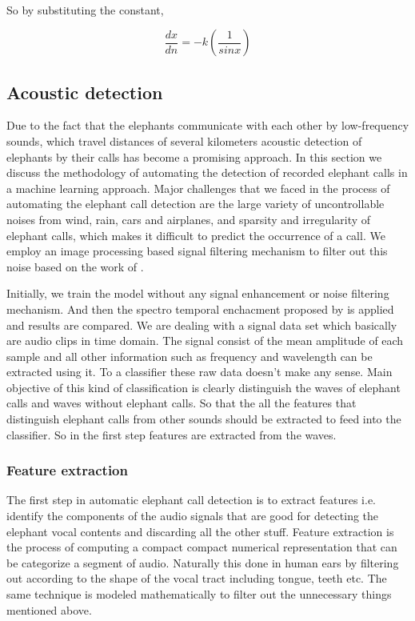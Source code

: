 \documentclass[12pt]{article}
\numberwithin{figure}{section}
\numberwithin{table}{section}
\begin{document}
\paragraph{}
So by substituting the constant,

\begin{equation}
\frac{dx}{dn}=-k(\frac{1}{sin x})
\end{equation}



\subsection{Acoustic detection}
Due to the fact that the elephants communicate with each other by low-frequency sounds, which travel distances of several kilometers acoustic detection of elephants by their calls has become a promising approach. In this section we discuss the methodology of automating the detection of recorded elephant calls in a machine learning approach. Major challenges that we faced in the process of automating the elephant call detection are the large variety of uncontrollable noises from wind, rain, cars and airplanes, and sparsity and irregularity of elephant calls, which makes it difficult to predict the occurrence of a call. We employ an image processing based signal filtering mechanism to filter out this noise based on the work of \cite{11}.

Initially, we train the model without any signal enhancement or noise filtering mechanism. And then the spectro temporal enchacment proposed by \cite{11} is applied and results are compared. We are dealing with a signal data set which basically are audio clips in time domain. The signal consist of the mean amplitude of each sample and all other information such as frequency and wavelength can be extracted using it. To a classifier these raw data doesn't make any sense. Main objective of this kind of classification is clearly distinguish the waves of elephant calls and waves without elephant calls. So that the all the features that distinguish elephant calls from other sounds should be extracted to feed into the classifier. So in the first step features are extracted from the waves.

\subsubsection{Feature extraction}
The first step in automatic elephant call detection is to extract features i.e. identify the components of the audio signals that are good for detecting the elephant vocal contents and discarding all the other stuff. Feature extraction is the process of computing a compact compact numerical representation that can be categorize a segment of audio. Naturally this done in human ears by filtering out according to the shape of the vocal tract including tongue, teeth etc. The same technique is modeled mathematically to filter out the unnecessary things mentioned above. 
\end{document}
